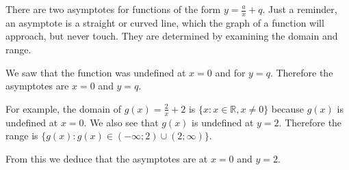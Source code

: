           
        
        \label{m39341*uid156}
            \nopagebreak
            
          
          \label{m39341*id248536}There are two asymptotes for functions of the form \begin{math}y=\frac{a}{x}+q\end{math}. Just a reminder, an asymptote is a straight or curved line, which the graph of a function will approach, but never touch. They are determined by examining the domain and range.\par 
          \label{m39341*id248567}We saw that the function was undefined at \begin{math}x=0\end{math} and for \begin{math}y=q\end{math}. Therefore the asymptotes are \begin{math}x=0\end{math} and \begin{math}y=q\end{math}.\par 
          \label{m39341*id248630}For example, the domain of \begin{math}g\left(x\right)=\frac{2}{x}+2\end{math} is \begin{math}\{x:x\in \mathbb{R},x\ne 0\}\end{math} because \begin{math}g\left(x\right)\end{math} is undefined at \begin{math}x=0\end{math}. We also see that \begin{math}g\left(x\right)\end{math} is undefined at \begin{math}y=2\end{math}. Therefore the range is \begin{math}\{g\left(x\right):g\left(x\right)\in \left(-\infty ;2\right)\cup \left(2;\infty \right)\}\end{math}.\par 
          \label{m39341*id248820}From this we deduce that the asymptotes are at \begin{math}x=0\end{math} and \begin{math}y=2\end{math}.\par 
        
